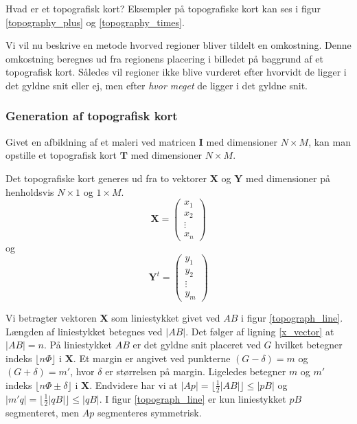 {

Hvad er et topografisk kort? Eksempler på topografiske kort kan ses i
figur \ref{topography_plus} og \ref{topography_times}.

Vi vil nu beskrive en metode hvorved regioner bliver tildelt en
omkostning. Denne omkostning beregnes ud fra regionens placering i
billedet på baggrund af et topografisk kort. Således vil regioner ikke
blive vurderet efter hvorvidt de ligger i det gyldne snit eller ej, men
efter \emph{hvor meget} de ligger i det gyldne snit.

\subsubsection*{Generation af topografisk kort}

Givet en afbildning af et maleri ved matricen $\mathbf{I}$ med dimensioner
$N \times{} M$, kan man opstille et topografisk kort $\mathbf{T}$ med dimensioner
$N \times{} M$.

Det topografiske kort generes ud fra to vektorer $\mathbf{X}$ og
$\mathbf{Y}$ med dimensioner på henholdsvis $N \times 1$ og $1 \times M$.
\begin{equation}
    \mathbf{X} = \left(
    \begin{array}{c}
        x_1     \\
        x_2     \\
        \vdots  \\
        x_n
    \end{array} \right)
    \label{x_vector}
\end{equation}
og
\begin{equation}
    \mathbf{Y}^{t} = \left(
    \begin{array}{c}
        y_1     \\
        y_2     \\
        \vdots  \\
        y_m
    \end{array} \right)
\end{equation}

Vi betragter vektoren $\mathbf{X}$ som liniestykket givet ved $AB$ i
figur \ref{topograph_line}. Længden af liniestykket betegnes ved $|AB|$.
Det følger af ligning \ref{x_vector} at $|AB| = n$. På liniestykket $AB$
er det gyldne snit placeret ved $G$ hvilket betegner indeks $\lfloor
n\varPhi \rfloor$ i $\mathbf{X}$. Et margin er angivet ved punkterne $(G
- \delta) = m$ og $(G + \delta) = m'$, hvor $\delta$ er størrelsen på
margin. Ligeledes betegner $m$ og $m'$ indeks $\lfloor n \varPhi \pm
\delta \rfloor$ i $\mathbf{X}$.  Endvidere har vi at $|Ap| = \lfloor
\frac{1}{2}|AB| \rfloor \leq |pB|$ og $|m'q| = \lfloor \frac{1}{2}|qB|
\rfloor \leq |qB|$. I figur \ref{topograph_line} er kun liniestykket
$pB$ segmenteret, men $Ap$ segmenteres symmetrisk.

}
